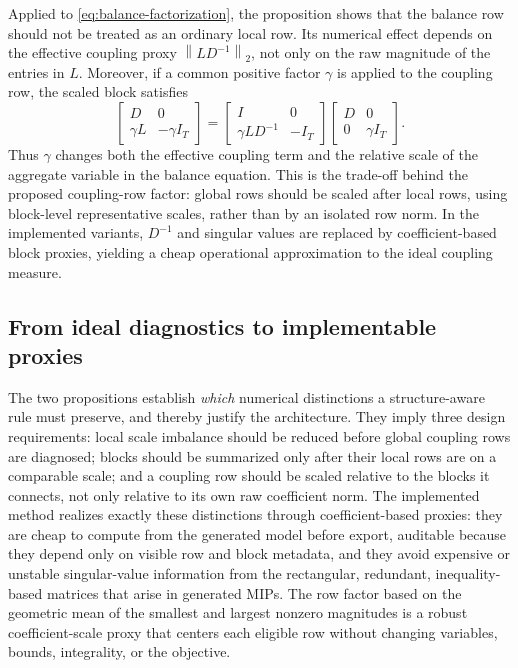 \documentclass[AMA,Times1COL]{WileyNJDv5} %
\newcommand{\norm}[1]{\left\lVert #1 \right\rVert}
\providecommand{\DIFadd}[1]{{\protect\color{blue} \sf #1}} %
\providecommand{\DIFaddbegin}{} %
\begin{document}
Applied to \eqref{eq:balance-factorization}, the proposition shows that the balance row
should not be treated as an ordinary local row. Its numerical effect depends on the
effective coupling proxy $\norm{LD^{-1}}_2$, not only on the raw magnitude of the
entries in $L$. Moreover, if a common positive factor $\gamma$ is applied to the coupling
row, the scaled block satisfies
\begin{equation}
\begin{bmatrix}
D & 0\\
\gamma L & -\gamma I_T
\end{bmatrix}
=
\begin{bmatrix}
I & 0\\
\gamma LD^{-1} & -I_T
\end{bmatrix}
\begin{bmatrix}
D & 0\\
0 & \gamma I_T
\end{bmatrix}.
\label{eq:scaled-balance-factorization}
\end{equation}
Thus $\gamma$ changes both the effective coupling term and the relative scale of the
aggregate variable in the balance equation. This is the trade-off behind the proposed
coupling-row factor: global rows should be scaled after local rows, using block-level
representative scales, rather than by an isolated row norm. In the implemented variants,
$D^{-1}$ and singular values are replaced by coefficient-based block proxies, yielding a
cheap operational approximation to the ideal coupling measure.


\DIFaddbegin \subsection{\DIFadd{From ideal diagnostics to implementable proxies}}
\label{subsec:ideal-to-proxies}

\DIFadd{The two propositions establish \emph{which} numerical distinctions a structure-aware
rule must preserve, and thereby justify the architecture. They imply three design
requirements: local scale imbalance should be reduced before global coupling rows are
diagnosed; blocks should be summarized only after their local rows are on a comparable
scale; and a coupling row should be scaled relative to the blocks it connects, not only
relative to its own raw coefficient norm. The implemented method realizes exactly these
distinctions through coefficient-based proxies: they are cheap to compute from the
generated model before export, auditable because they depend only on visible row and
block metadata, and they avoid expensive or unstable singular-value information from the
rectangular, redundant, inequality-based matrices that arise in generated MIPs. The row
factor based on the geometric mean of the smallest and largest nonzero magnitudes is a
robust coefficient-scale proxy that centers each eligible row without changing variables,
bounds, integrality, or the objective.
}
\end{document}
